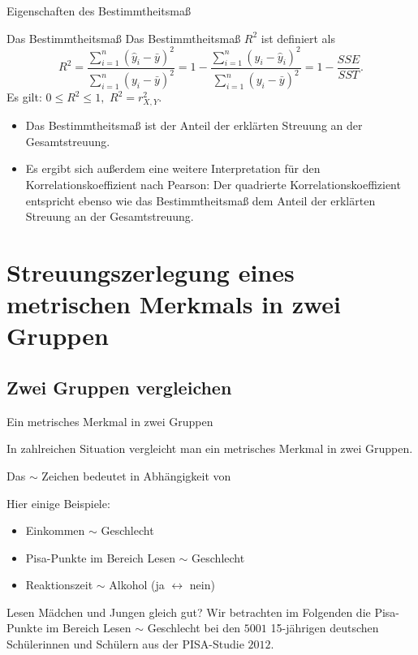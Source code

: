\documentclass[usenames,dvipsnames,handout]{beamer}
\begin{document}
 \begin{frame}{Eigenschaften des Bestimmtheitsmaß}
 
 \begin{block}{Das Bestimmtheitsmaß}
 Das Bestimmtheitsmaß $R^{2}$ ist definiert als
 \begin{equation}
 R^{2} =\frac{\sum_{i=1}^{n}(\hat{y}_{i}-\bar{y})^{2}}{\sum_{i=1}^{n}(y_{i}-\bar{y})^{2}} =1-\frac{\sum_{i=1}^{n}(y_{i}-\hat{y}_{i})^{2}}{\sum_{i=1}^{n}(y_{i}-\bar{y})^{2}} = 1-\frac{SSE}{SST}.
 \end{equation}
 Es gilt: $0 \leq R^{2} \leq 1,$ $R^{2} =r_{X,Y}^{2}.$
 \end{block}\pause
 \begin{itemize}
 \item{Das Bestimmtheitsmaß ist der Anteil der erklärten Streuung  an der Gesamtstreuung.}\pause
 \item{Es ergibt sich außerdem eine weitere Interpretation für den Korrelationskoeffizient nach Pearson:
 Der quadrierte Korrelationskoeffizient entspricht ebenso wie das Bestimmtheitsmaß 
 dem Anteil der erklärten Streuung an der Gesamtstreuung.}
 \end{itemize}
 \end{frame}
\section{Streuungszerlegung eines metrischen Merkmals in zwei Gruppen}
 
 \subsection{Zwei Gruppen vergleichen}
\begin{frame}{Ein metrisches Merkmal in zwei Gruppen}
\begin{description}
\item{In zahlreichen Situation vergleicht man ein metrisches Merkmal in zwei Gruppen.}\pause
\item{Das $\sim$ Zeichen bedeutet in Abhängigkeit von}
\end{description}\pause
Hier einige Beispiele:
\begin{itemize}
\item{Einkommen $\sim$ Geschlecht}\pause
\item{Pisa-Punkte im Bereich Lesen $\sim$ Geschlecht}\pause
\item{Reaktionszeit $\sim$ Alkohol (ja $\leftrightarrow$ nein)}
\end{itemize}\pause
\begin{block}{Lesen Mädchen und Jungen gleich gut?}
Wir betrachten im Folgenden die Pisa-Punkte im Bereich Lesen $\sim$ Geschlecht
bei den $5001$ 15-jährigen deutschen Schülerinnen und Schülern aus der PISA-Studie $2012.$
\end{block}
\end{frame}
\end{document}
